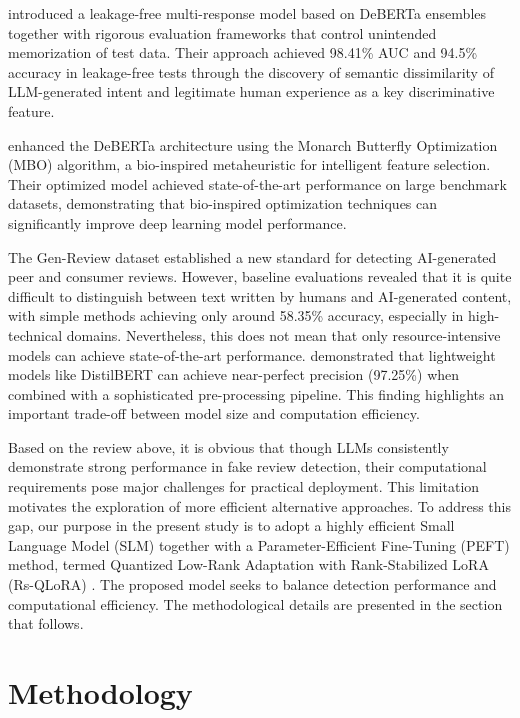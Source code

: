 \documentclass[utf8]{FrontiersinHarvard}
\begin{document}
\citet{Ranjan2025} introduced a leakage-free multi-response model based on DeBERTa ensembles together with rigorous evaluation frameworks that control unintended memorization of test data. Their approach achieved 98.41\% AUC and 94.5\% accuracy in leakage-free tests through the discovery of semantic dissimilarity of LLM-generated intent and legitimate human experience as a key discriminative feature.

\citet{Geetha2025} enhanced the DeBERTa architecture using the Monarch Butterfly Optimization (MBO) algorithm, a bio-inspired metaheuristic for intelligent feature selection. Their optimized model achieved state-of-the-art performance on large benchmark datasets, demonstrating that bio-inspired optimization techniques can significantly improve deep learning model performance.

The Gen-Review dataset \citep{Demetrio2025} established a new standard for detecting AI-generated peer and consumer reviews. However, baseline evaluations revealed that it is quite difficult to distinguish between text written by humans and AI-generated content, with simple methods achieving only around 58.35\% accuracy, especially in high-technical domains. Nevertheless, this does not mean that only resource-intensive models can achieve state-of-the-art performance. \citet{AlQadi2025} demonstrated that lightweight models like DistilBERT can achieve near-perfect precision (97.25\%) when combined with a sophisticated pre-processing pipeline. This finding highlights an important trade-off between model size and computation efficiency.

Based on the review above, it is obvious that though LLMs consistently demonstrate strong performance in fake review detection, their computational requirements pose major challenges for practical deployment. This limitation motivates the exploration of more efficient alternative approaches. To address this gap, our purpose in the present study is to adopt a highly efficient Small Language Model (SLM) together with a Parameter-Efficient Fine-Tuning (PEFT) method, termed Quantized Low-Rank Adaptation with Rank-Stabilized LoRA (Rs-QLoRA) \citep{Hu2021, Dettmers2023}. The proposed model seeks to balance detection performance and computational efficiency. The methodological details are presented in the section that follows.



\section{Methodology}
\end{document}
